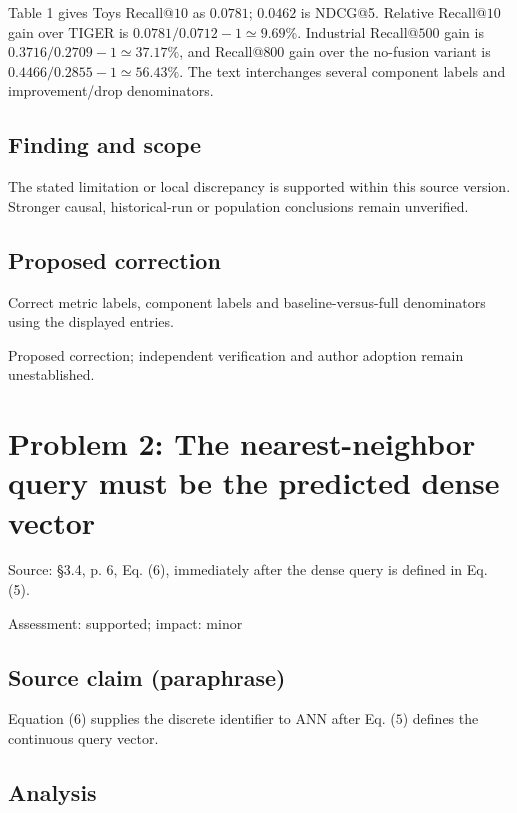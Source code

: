\documentclass[11pt]{article}
\begin{document}
Table 1 gives Toys Recall@\(10\) as \(0.0781\); \(0.0462\) is NDCG@5. Relative Recall@\(10\) gain over TIGER is \(0.0781/0.0712-1\simeq9.69\%\). Industrial Recall@\(500\) gain is \(0.3716/0.2709-1\simeq37.17\%\), and Recall@\(800\) gain over the no-fusion variant is \(0.4466/0.2855-1\simeq56.43\%\). The text interchanges several component labels and improvement/drop denominators.

\subsection*{Finding and scope}

The stated limitation or local discrepancy is supported within this source version. Stronger causal, historical-run or population conclusions remain unverified.

\subsection*{Proposed correction}

Correct metric labels, component labels and baseline-versus-full denominators using the displayed entries.

Proposed correction; independent verification and author adoption remain unestablished.

\section*{Problem 2: The nearest-neighbor query must be the predicted dense vector}

Source: §3.4, p. 6, Eq. (6), immediately after the dense query is defined in Eq. (5).

Assessment: supported; impact: minor

\subsection*{Source claim (paraphrase)}

Equation (\(6\)) supplies the discrete identifier to ANN after Eq. (\(5\)) defines the continuous query vector.

\subsection*{Analysis}
\end{document}
